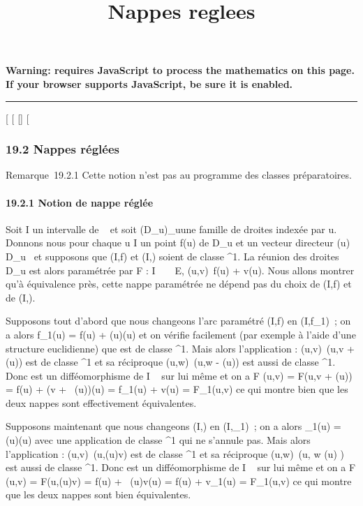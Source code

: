 \documentclass[]{article}
\title{Nappes reglees}
\author{}
\date{}
\begin{document}
\maketitle

\textbf{Warning: 
requires JavaScript to process the mathematics on this page.\\ If your
browser supports JavaScript, be sure it is enabled.}

\begin{center}\rule{3in}{0.4pt}\end{center}

{[}
{[}
{[}{]}
{[}

\subsubsection{19.2 Nappes réglées}

Remarque~19.2.1 Cette notion n'est pas au programme des classes
préparatoires.

\paragraph{19.2.1 Notion de nappe réglée}

Soit I un intervalle de ~ et soit (D\_u)\_u\inI une
famille de droites indexée par u. Donnons nous pour chaque u \in I un
point f(u) de D\_u et un vecteur directeur
\vecg(u) \in\overrightarrow
D\_u \diagdown\0\ et supposons que
(I,f) et (I,\vecg) soient de classe ^1.
La réunion des droites D\_u est alors paramétrée par F : I \times {}~ \rightarrow~
E, (u,v)\mapsto~f(u) + v\vecg(u).
Nous allons montrer qu'à équivalence près, cette nappe paramétrée ne
dépend pas du choix de (I,f) et de (I,\vecg).

Supposons tout d'abord que nous changeons l'arc paramétré (I,f) en
(I,f\_1)~; on a alors f\_1(u) = f(u) +
\phi(u)\vecg(u) et on vérifie facilement (par exemple à
l'aide d'une structure euclidienne) que \phi est de classe ^1.
Mais alors l'application \theta : (u,v)\mapsto~(u,v +
\phi(u)) est de classe ^1 et sa réciproque
(u,w)\mapsto~(u,w - \phi(u)) est aussi de classe
^1. Donc \theta est un difféomorphisme de I \times {}~ sur lui même et
on a F \cdot \theta(u,v) = F(u,v + \phi(u)) = f(u) + (v +
\alpha~(u))\vecg(u) = f\_1(u) +
v\vecg(u) = F\_1(u,v) ce qui montre bien que
les deux nappes sont effectivement équivalentes.

Supposons maintenant que nous changeons (I,\vecg) en
(I,\vecg\_1)~; on a alors
\vecg\_1(u) = \psi(u)\vecg(u)
avec une application \psi de classe ^1 qui ne s'annule pas.
Mais alors l'application \theta : (u,v)\mapsto~(u,\psi(u)v)
est de classe ^1 et sa réciproque
(u,w)\mapsto~(u, w \over \psi(u) )
est aussi de classe ^1. Donc \theta est un difféomorphisme de I \times
{}~ sur lui même et on a F \cdot \theta(u,v) = F(u,\psi(u)v) = f(u) +
\beta~(u)v\vecg(u) = f(u) +
v\vecg\_1(u) = F\_1(u,v) ce qui
montre que les deux nappes sont bien équivalentes.
\end{document}
